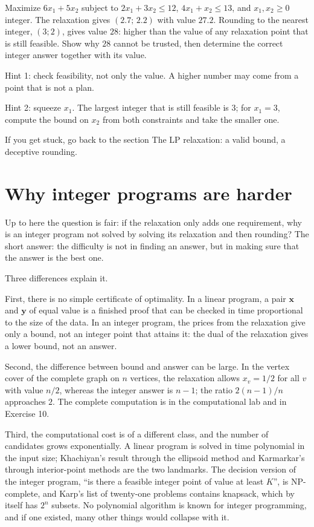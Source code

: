 \begin{tantangan}
Maximize $6x_{1}+5x_{2}$ subject to $2x_{1}+3x_{2}\le12$, $4x_{1}+x_{2}\le13$, and
$x_{1},x_{2}\ge0$ integer. The relaxation gives $(2.7;\,2.2)$ with value $27.2$.
Rounding to the nearest integer, $(3;2)$, gives value $28$: higher than the value of any
relaxation point that is still feasible. Show why $28$ cannot be trusted, then determine the
correct integer answer together with its value.

Hint 1: check feasibility, not only the value. A higher number may come from a point that is
not a plan.

Hint 2: squeeze $x_{1}$. The largest integer that is still feasible is $3$; for
$x_{1}=3$, compute the bound on $x_{2}$ from both constraints and take the smaller one.

If you get stuck, go back to the section The LP relaxation: a valid bound, a deceptive
rounding.
\end{tantangan}

\section{Why integer programs are harder}

Up to here the question is fair: if the relaxation only adds one requirement, why is an integer
program not solved by solving its relaxation and then rounding? The short answer: the difficulty
is not in finding an answer, but in making sure that the answer is the best one.

Three differences explain it.

First, there is no simple certificate of optimality. In a linear program, a pair $\mathbf{x}$
and $\mathbf{y}$ of equal value is a finished proof that can be checked in time proportional to
the size of the data. In an integer program, the prices from the relaxation give only a bound,
not an integer point that attains it: the dual of the relaxation gives a lower bound, not an
answer.

Second, the difference between bound and answer can be large. In the vertex cover of the
complete graph on $n$ vertices, the relaxation allows $x_{v}=1/2$ for all $v$ with value $n/2$,
whereas the integer answer is $n-1$; the ratio $2(n-1)/n$ approaches $2$. The complete
computation is in the computational lab and in Exercise 10.

Third, the computational cost is of a different class, and the number of candidates grows
exponentially. A linear program is solved in time polynomial in the input size; Khachiyan's
result through the ellipsoid method and Karmarkar's through interior-point methods are the two
landmarks. The decision version of the integer program, ``is there a feasible integer point of
value at least $K$'', is NP-complete, and Karp's list of twenty-one problems contains knapsack,
which by itself has $2^{n}$ subsets. No polynomial algorithm is known for integer programming,
and if one existed, many other things would collapse with it.


